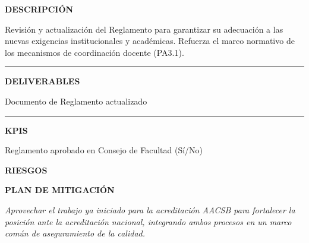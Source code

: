 \documentclass[11pt,a4paper]{scrreprt}
\newcommand{\fieldlabel}[1]{%
  {\footnotesize\sffamily\bfseries\color{mutedcolor}\MakeUppercase{#1}}\par\nopagebreak[4]
}
\newcommand{\fieldsep}{\vspace{3pt}\noindent\textcolor{bordercolor}{\rule{\linewidth}{0.4pt}}\vspace{3pt}\par}
\begin{document}
\begin{tcolorbox}[pabox={gobcolor}{PA1.2 \enspace\textbullet\enspace Revisión y actualización del Reglamento de la Facultad}]

\fieldlabel{Descripci\'on}
{\small Revisión y actualización del Reglamento para garantizar su adecuación a las nuevas exigencias institucionales y académicas. Refuerza el marco normativo de los mecanismos de coordinación docente (PA3.1).}\par
\fieldsep
\fieldlabel{Deliverables}
{\small Documento de Reglamento actualizado}\par
\fieldsep
\fieldlabel{KPIs}
{\small Reglamento aprobado en Consejo de Facultad (Sí/No)}\par
\end{tcolorbox}
\begin{tcolorbox}[riskbox]
{\footnotesize\sffamily\bfseries\color{red!50!black} RIESGOS}\par{}
\end{tcolorbox}
\begin{tcolorbox}[mitbox]
{\footnotesize\sffamily\bfseries\color{green!40!black} PLAN DE MITIGACI\'ON}\par{}
\end{tcolorbox}
\vspace{8pt}

\newpage
{}
{\small\color{mutedcolor}\itshape Aprovechar el trabajo ya iniciado para la acreditación AACSB para fortalecer la posición ante la acreditación nacional, integrando ambos procesos en un marco común de aseguramiento de la calidad.}\par\vspace{6pt}
\end{document}
